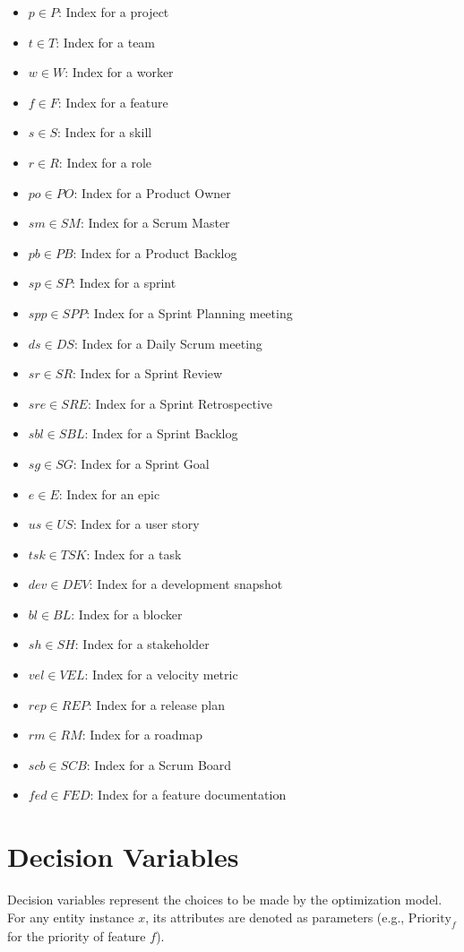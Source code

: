 \documentclass[a4paper, 11pt]{article}
\begin{document}
\begin{itemize}
    \item $p \in P$: Index for a project
    \item $t \in T$: Index for a team
    \item $w \in W$: Index for a worker
    \item $f \in F$: Index for a feature
    \item $s \in S$: Index for a skill
    \item $r \in R$: Index for a role
    \item $po \in PO$: Index for a Product Owner
    \item $sm \in SM$: Index for a Scrum Master
    \item $pb \in PB$: Index for a Product Backlog
    \item $sp \in SP$: Index for a sprint
    \item $spp \in SPP$: Index for a Sprint Planning meeting
    \item $ds \in DS$: Index for a Daily Scrum meeting
    \item $sr \in SR$: Index for a Sprint Review
    \item $sre \in SRE$: Index for a Sprint Retrospective
    \item $sbl \in SBL$: Index for a Sprint Backlog
    \item $sg \in SG$: Index for a Sprint Goal
    \item $e \in E$: Index for an epic
    \item $us \in US$: Index for a user story
    \item $tsk \in TSK$: Index for a task
    \item $dev \in DEV$: Index for a development snapshot
    \item $bl \in BL$: Index for a blocker
    \item $sh \in SH$: Index for a stakeholder
    \item $vel \in VEL$: Index for a velocity metric
    \item $rep \in REP$: Index for a release plan
    \item $rm \in RM$: Index for a roadmap
    \item $scb \in SCB$: Index for a Scrum Board
    \item $fed \in FED$: Index for a feature documentation
\end{itemize}

\section{Decision Variables}
\label{sec:decision_variables}
Decision variables represent the choices to be made by the optimization model. For any entity instance $x$, its attributes are denoted as parameters (e.g., $\text{Priority}_f$ for the priority of feature $f$).
\end{document}
